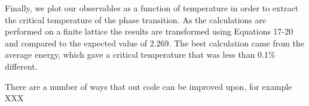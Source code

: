 \documentclass[prc,amsmath,twocolumn,superscriptaddress]{revtex4}
\begin{document}
Finally, we plot our observables as a function of temperature in order to extract the critical temperature of the phase transition. As the calculations are performed on a finite lattice the results are transformed using Equations 17-20 and compared to the expected value of 2.269. The best calculation came from the average energy, which gave a critical temperature that was less than 0.1\% different.




There are a number of ways that out code can be improved upon, for example XXX







\end{document}
